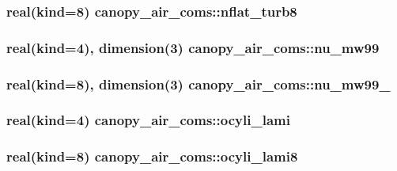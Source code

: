 \subsubsection[{nflat\+\_\+turb8}]{\setlength{\rightskip}{0pt plus 5cm}real(kind=8) canopy\+\_\+air\+\_\+coms\+::nflat\+\_\+turb8}\label{namespacecanopy__air__coms_afd3231b755fb237410e1c5996483b57e}
\hypertarget{namespacecanopy__air__coms_aa50afa7c99107797c84ed294a6215584}{}
\subsubsection[{nu\+\_\+mw99}]{\setlength{\rightskip}{0pt plus 5cm}real(kind=4), dimension(3) canopy\+\_\+air\+\_\+coms\+::nu\+\_\+mw99}\label{namespacecanopy__air__coms_aa50afa7c99107797c84ed294a6215584}
\hypertarget{namespacecanopy__air__coms_ae39097ce08183e89c3ed7ee9fba45cfb}{}
\subsubsection[{nu\+\_\+mw99\+\_\+8}]{\setlength{\rightskip}{0pt plus 5cm}real(kind=8), dimension(3) canopy\+\_\+air\+\_\+coms\+::nu\+\_\+mw99\+\_}\label{namespacecanopy__air__coms_ae39097ce08183e89c3ed7ee9fba45cfb}
\hypertarget{namespacecanopy__air__coms_aefa9b43396983e571ef5c4d1235b3884}{}
\subsubsection[{ocyli\+\_\+lami}]{\setlength{\rightskip}{0pt plus 5cm}real(kind=4) canopy\+\_\+air\+\_\+coms\+::ocyli\+\_\+lami}\label{namespacecanopy__air__coms_aefa9b43396983e571ef5c4d1235b3884}
\hypertarget{namespacecanopy__air__coms_a6fe72df71f0ed3c59b06b99e7291d5f5}{}
\subsubsection[{ocyli\+\_\+lami8}]{\setlength{\rightskip}{0pt plus 5cm}real(kind=8) canopy\+\_\+air\+\_\+coms\+::ocyli\+\_\+lami8}\label{namespacecanopy__air__coms_a6fe72df71f0ed3c59b06b99e7291d5f5}
\hypertarget{namespacecanopy__air__coms_ad9c2e83605f784b3a5f68fc55b0d682d}{}
